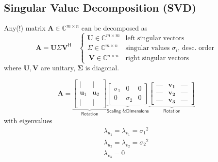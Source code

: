 
\subsection{Singular Value Decomposition (SVD)}

Any(!) matrix $\mathbf{A}\in \mathbb{C}^{m\times n}$ can be decomposed as
\noindent\begin{equation*}
    \mathbf{A}=\mathbf{U}\Sigma \mathbf{V}^{\mathsf{H}}\quad \begin{cases}
        \mathbf{U}\in \mathbb{C}^{m\times m} & \text{left singular vectors}                          \\
        \Sigma\in \mathbb{C}^{m\times n}     & \text{singular values }\sigma_i \text{, desc.\ order} \\\
        \mathbf{V}\in \mathbb{C}^{n\times n} & \text{right singular vectors}\
    \end{cases}
\end{equation*}
where $\mathbf{U}, \mathbf{V}$ are unitary, $\boldsymbol{\Sigma}$ is diagonal.

\ptitle{$2\times 3$ Example}

\noindent\begin{equation*}
    \mathbf{A}=
    \underbrace{\begin{bmatrix}
            \vert        & \vert        \\
            \mathbf{u}_1 & \mathbf{u}_2 \\
            \vert        & \vert
        \end{bmatrix}}_{\textsf{Rotation}}
    \underbrace{\begin{bmatrix}
            \sigma_1 & 0        & 0 \\
            0        & \sigma_2 & 0
        \end{bmatrix}}_{\textsf{Scaling \& Dimensions}}
    \underbrace{\begin{bmatrix}
            \text{---} & \mathbf{v_1} & \text{---} \\
            \text{---} & \mathbf{v_2} & \text{---} \\
            \text{---} & \mathbf{v_3} & \text{---}
        \end{bmatrix}}_{\textsf{Rotation}}
\end{equation*}
with eigenvalues
\noindent\begin{gather*}
    \lambda_{u_1}=\lambda_{v_1}={\sigma_1}^2\\
    \lambda_{u_2}=\lambda_{v_2}={\sigma_2}^2\\
    \lambda_{v_3}=0
\end{gather*}

